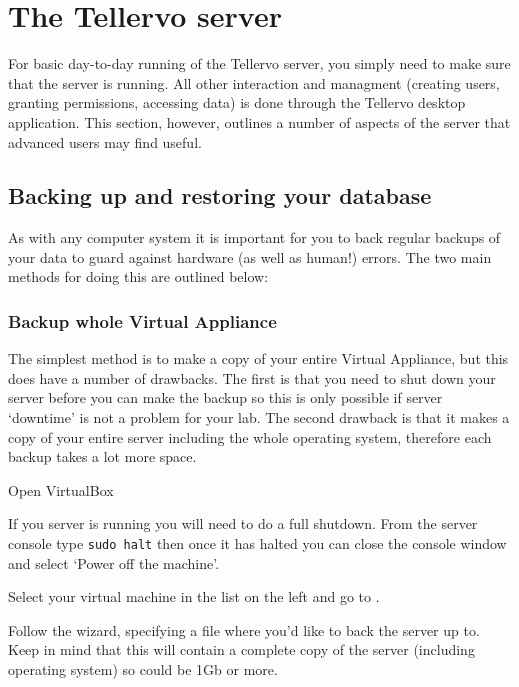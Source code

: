 
\chapter{The Tellervo server}
\label{txt:servermaintenance}

For basic day-to-day running of the Tellervo server, you simply need to make sure that the server is running.  All other interaction and managment (creating users, granting permissions, accessing data) is done through the Tellervo desktop application.  This section, however, outlines a number of aspects of the server that advanced users may find useful.

\section{Backing up and restoring your database}
As with any computer system it is important for you to back regular backups of your data to guard against hardware (as well as human!) errors. The two main methods for doing this are outlined below:

\subsection{Backup whole Virtual Appliance}
\label{txt:BackupVA}
The simplest method is to make a copy of your entire Virtual Appliance, but this does have a number of drawbacks.  The first is that you need to shut down your server before you can make the backup so this is only possible if server `downtime' is not a problem for your lab.  The second drawback is that it makes a copy of your entire server including the whole operating system, therefore each backup takes a lot more space.  

\begin{enumerate*}
 \item Open VirtualBox
 \item If you server is running you will need to do a full shutdown.  From the server console type \verb|sudo halt| then once it has halted you can close the console window and select `Power off the machine'. 
 \item Select your virtual machine in the list on the left and go to .
 \item Follow the wizard, specifying a file where you'd like to back the server up to.  Keep in mind that this will contain a complete copy of the server (including operating system) so could be 1Gb or more.
\end{enumerate*}

